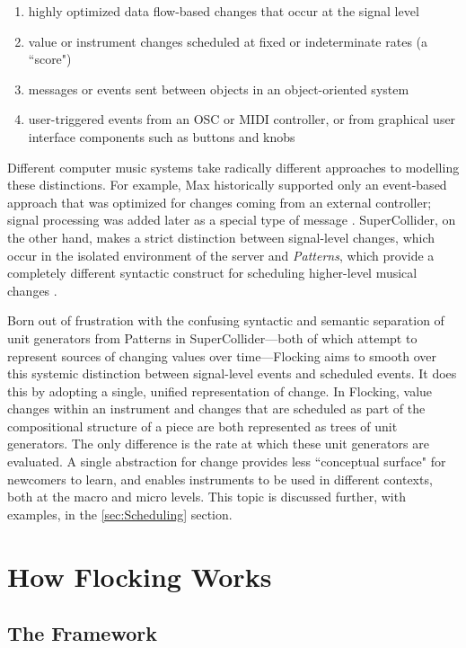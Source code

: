\documentclass{article}
\begin{document}
\begin{enumerate}
\item highly optimized data flow-based changes that occur at the signal level
\item value or instrument changes scheduled at fixed or indeterminate rates (a ``score")
\item messages or events sent between objects in an object-oriented system
\item user-triggered events from an OSC or MIDI controller, or from graphical user interface components such as buttons and knobs
\end{enumerate}

Different computer music systems take radically different approaches to modelling these distinctions. For example, Max historically supported only an event-based approach that was optimized for changes coming from an external controller; signal processing was added later as a special type of message \cite{puckette2002max}. SuperCollider, on the other hand, makes a strict distinction between signal-level changes, which occur in the isolated environment of the server \cite{mccartney1996supercollider} and {\it Patterns}, which provide a completely different syntactic construct for scheduling higher-level musical changes \cite[pp. 189]{wilson2011supercollider}.

Born out of frustration with the confusing syntactic and semantic separation of unit generators from Patterns in SuperCollider---both of which attempt to represent sources of changing values over time---Flocking aims to smooth over this systemic distinction between signal-level events and scheduled events. It does this by adopting a single, unified representation of change. In Flocking, value changes within an instrument and changes that are scheduled as part of the compositional structure of a piece are both represented as trees of unit generators. The only difference is the rate at which these unit generators are evaluated. A single abstraction for change provides less ``conceptual surface" for newcomers to learn, and enables instruments to be used in different contexts, both at the macro and micro levels. This topic is discussed further, with examples, in the \ref{sec:Scheduling} section.

\section{How Flocking Works}

\subsection{The Framework}
\end{document}
